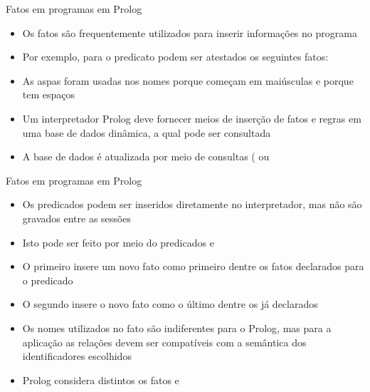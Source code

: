 \begin{frame}[fragile]{Fatos em programas em Prolog}

    \begin{itemize}
        \item Os fatos são frequentemente utilizados para inserir informações no programa

        \item Por exemplo, para o predicato  podem ser atestados os 
            seguintes fatos:


        \item As aspas foram usadas nos nomes porque começam em maiúsculas e porque tem espaços

        \item Um interpretador Prolog deve fornecer meios de inserção de fatos e regras em uma 
            base de dados dinâmica, a qual pode ser consultada

        \item A base de dados é atualizada por meio de consultas ( ou

    \end{itemize}

\end{frame}

\begin{frame}[fragile]{Fatos em programas em Prolog}

    \begin{itemize}
        \item Os predicados podem ser inseridos diretamente no interpretador, mas não são
            gravados entre as sessões

        \item Isto pode ser feito por meio do predicados  e

        \item O primeiro insere um novo fato como primeiro dentre os fatos declarados para
            o predicado

        \item O segundo insere o novo fato como o último dentre os já declarados

        \item Os nomes utilizados no fato são indiferentes para o Prolog, mas para a aplicação 
            as relações devem ser compatíveis com a semântica dos identificadores escolhidos

        \item Prolog considera distintos os fatos  e 



    \end{itemize}

\end{frame}
